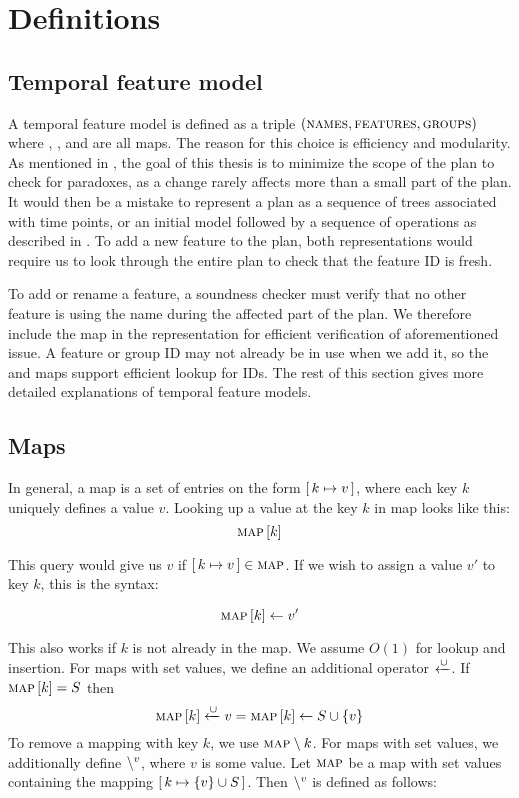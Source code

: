 \section{Definitions}

\subsection{Temporal feature model}
\label{sub:temporal-feature-model}
A temporal feature model is defined as a triple $(\textsc{names}, \textsc{features}, \textsc{groups}{})$ where \names, \features, and \groups{} are all maps. The reason for this choice is efficiency and modularity. As mentioned in , the goal of this thesis is to minimize the scope of the plan to check for paradoxes, as a change rarely affects more than a small part of the plan. It would then be a mistake to represent a plan as a sequence of trees associated with time points, or an initial model followed by a sequence of operations as described in  \parencite{art:consistency-preserving-evolution-planning}. To add a new feature to the plan, both representations would require us to look through the entire plan to check that the feature ID is fresh.

To add or rename a feature, a soundness checker must verify that no other feature is using the name during the affected part of the plan. We therefore include the \names{} map in the representation for efficient verification of aforementioned issue. A feature or group ID may not already be in use when we add it, so the \features{} and \groups{} maps support efficient lookup for IDs. The rest of this section gives more detailed explanations of temporal feature models.

\subsection{Maps}
\label{sub:maps}

In general, a map is a set of entries on the form $[ \,k \mapsto v\, ]$, where each key $k$ uniquely defines a value $v$. Looking up a value at the key $k$ in map  looks like this:
\[
  \textsc{map} \left[ k \right]
\]

This query would give us $v$ if $[ \,k \mapsto v\, ] \in \textsc{map}$. If we wish to assign a value $v'$ to key $k$, this is the syntax:

\[
\textsc{map} \left[ k \right] \leftarrow v'
\]

This also works if $k$ is not already in the map. We assume $O(1)$ for lookup and insertion. For maps with set values, we define an additional operator $\xleftarrow{\cup}$. If $\textsc{map} \left[ k \right] = S$ then 
\[\textsc{map} \left[ k \right] \xleftarrow{\cup} v = \textsc{map} \left[ k \right] \leftarrow S \cup \{v\}\]
To remove a mapping with key $k$, we use $\textsc{map} \setminus k$. For maps with set values, we additionally define $\setminus^{v}$, where $v$ is some value. Let $\textsc{map}$ be a map with set values containing the mapping $[ \,k \mapsto \{v\} \cup S\, ]$. Then $\setminus^{v}$ is defined as follows:

